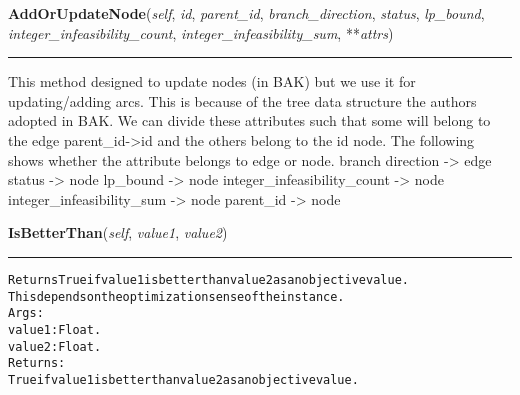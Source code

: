\hspace{.8\funcindent}\begin{boxedminipage}{\funcwidth}

    \raggedright \textbf{AddOrUpdateNode}(\textit{self}, \textit{id}, \textit{parent\_id}, \textit{branch\_direction}, \textit{status}, \textit{lp\_bound}, \textit{integer\_infeasibility\_count}, \textit{integer\_infeasibility\_sum}, **\textit{attrs})

    \vspace{-1.5ex}

    \rule{\textwidth}{0.5\fboxrule}
\setlength{\parskip}{2ex}
    This method designed to update nodes (in BAK) but we use it for 
    updating/adding arcs. This is because of the tree data structure the 
    authors adopted in BAK. We can divide these attributes such that some 
    will belong to the edge parent\_id-{\textgreater}id and the others 
    belong to the id node. The following shows whether the attribute 
    belongs to edge or node. branch direction -{\textgreater} edge status 
    -{\textgreater} node lp\_bound -{\textgreater} node 
    integer\_infeasibility\_count -{\textgreater} node 
    integer\_infeasibility\_sum -{\textgreater} node parent\_id 
    -{\textgreater} node

\setlength{\parskip}{1ex}
    \end{boxedminipage}

    \label{coinor:grumpy:BB:BBTree:IsBetterThan}

    \vspace{0.5ex}

\hspace{.8\funcindent}\begin{boxedminipage}{\funcwidth}

    \raggedright \textbf{IsBetterThan}(\textit{self}, \textit{value1}, \textit{value2})

    \vspace{-1.5ex}

    \rule{\textwidth}{0.5\fboxrule}
\setlength{\parskip}{2ex}
\begin{alltt}

Returns True if value1 is better than value2 as an objective value.
This depends on the optimization sense of the instance.
Args:
  value1: Float.
  value2: Float.
Returns:
  True if value1 is better than value2 as an objective value.
\end{alltt}

\setlength{\parskip}{1ex}
    \end{boxedminipage}


